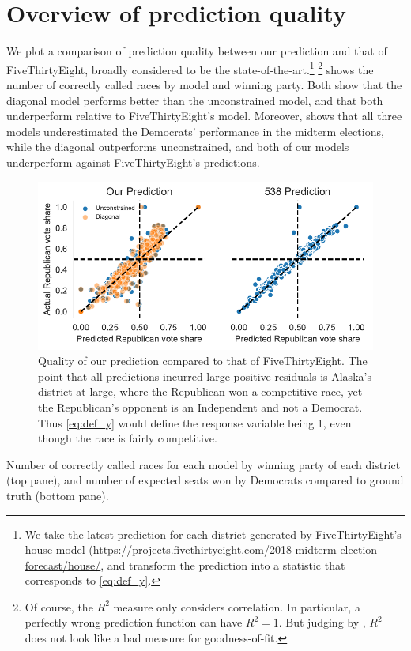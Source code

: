 \documentclass[12pt]{article}
\begin{document}
\section{Overview of prediction quality}
\label{sec:overview}
We plot a comparison of prediction quality between our prediction and that of FiveThirtyEight, broadly considered to be the state-of-the-art.\footnote{We take the latest prediction for each district generated by FiveThirtyEight's house model (\url{https://projects.fivethirtyeight.com/2018-midterm-election-forecast/house/}, and transform the prediction into a statistic that corresponds to \eqref{eq:def_y}.} \footnote{Of course, the $R^2$ measure only considers correlation. In particular, a perfectly wrong prediction function can have $R^2 = 1$. But judging by , $R^2$ does not look like a bad measure for goodness-of-fit.}  shows the number of correctly called races by model and winning party. Both  show that the diagonal model performs better than the unconstrained model, and that both underperform relative to FiveThirtyEight's model. Moreover,  shows that all three models underestimated the Democrats' performance in the midterm elections, while the diagonal outperforms unconstrained, and both of our models underperform against FiveThirtyEight's predictions.
\begin{figure}[tb]
  \centering
  \includegraphics{prediction_quality.pdf}
  \caption{Quality of our prediction compared to that of FiveThirtyEight. The point that all predictions incurred large positive residuals is Alaska's district-at-large, where the Republican won a competitive race, yet the Republican's opponent is an Independent and not a Democrat. Thus \eqref{eq:def_y} would define the response variable being 1, even though the race is fairly competitive.}
  \label{fig:quality}
\end{figure}
\begin{table}[tb]
  \caption{Number of correctly called races for each model by winning party of each district (top pane), and number of expected seats won by Democrats compared to ground truth (bottom pane).}
  \label{tab:res}
  \vspace{.4em}
  \centering

\end{table}
\end{document}
